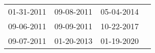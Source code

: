 \begin{supertabular}{llll}
 01-31-2011 &  09-08-2011 &  05-04-2014 \\
 09-06-2011 &  09-09-2011 &  10-22-2017 \\
 09-07-2011 &  01-20-2013 &  01-19-2020 \\
\end{supertabular}

